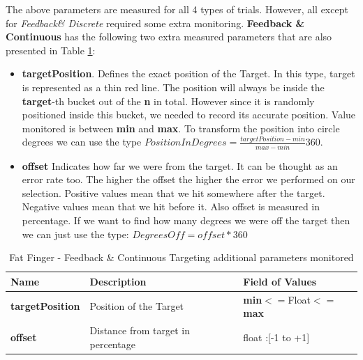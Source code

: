 The above parameters are measured for all 4 types of trials. However, all except for \emph{Feedback\& Discrete} required some extra monitoring. \textbf{Feedback \& Continuous} has the following two extra measured parameters that are also presented in Table \ref{tab:ffFNDData}:

\begin{itemize}
	\item \textbf{targetPosition}. Defines the exact position of the Target. In this type, target is represented as a thin red line. The position will always be inside the \textbf{target}-th bucket out of the \textbf{n} in total. However since it is randomly positioned inside this bucket, we needed to record its accurate position. Value monitored is between \textbf{min} and \textbf{max}. To transform the position into circle degrees we can use the type $PositionInDegrees = \frac{targetPosition-min}{max-min}360$.
	\item \textbf{offset} Indicates how far we were from the target. It can be thought as an error rate too. The higher the offset the higher the error we performed on our selection. Positive values mean that we hit somewhere after the target. Negative values mean that we hit before it. Also offset is measured in percentage. If we want to find how many degrees we were off the target then we can just use the type: $DegreesOff = offset*360$
\end{itemize}


\begin{table}[H]
\centering
\begin{tabular}{l || l || l}
Name & Description & Field of Values \\
\hline \hline
\textbf{targetPosition} & Position of the Target & \textbf{min}$<=$Float$<=$\textbf{max} \\
\textbf{offset} & Distance from target in percentage & float :[-1 to +1] 
\end{tabular}
\caption{Fat Finger - Feedback \& Continuous Targeting additional parameters monitored}
\label{tab:ffFNDData}
\end{table}


